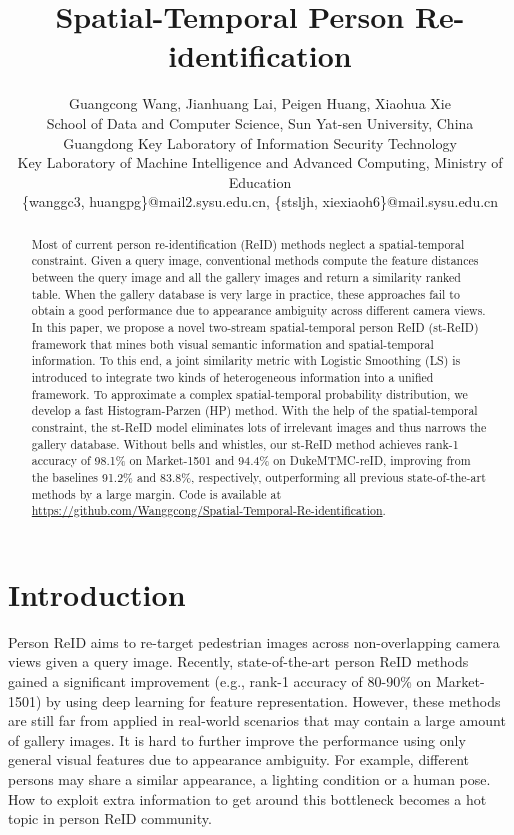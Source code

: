 \documentclass[letterpaper]{article} \usepackage{aaai19}  \usepackage{times}  \usepackage{helvet}  \usepackage{courier}  \usepackage{url}  \usepackage{graphicx}  \usepackage{subfig}
\begin{document}
\title{Spatial-Temporal Person Re-identification}
\author{Guangcong Wang, Jianhuang Lai, Peigen Huang, Xiaohua Xie\\
School of Data and Computer Science, Sun Yat-sen University, China\\
Guangdong Key Laboratory of Information Security Technology\\
Key Laboratory of Machine Intelligence and Advanced Computing, Ministry of Education\\
\{wanggc3, huangpg\}@mail2.sysu.edu.cn, \{stsljh, xiexiaoh6\}@mail.sysu.edu.cn\\
}
\maketitle
\begin{abstract}
Most of current person re-identification (ReID) methods neglect a spatial-temporal constraint. Given a query image, conventional methods compute the feature distances between the query image and all the gallery images and return a similarity ranked table. When the gallery database is very large in practice, these approaches fail to obtain a good performance due to appearance ambiguity across different camera views. In this paper, we propose a novel two-stream spatial-temporal person ReID (st-ReID) framework that mines both visual semantic information and spatial-temporal information. To this end, a joint similarity metric with Logistic Smoothing (LS) is introduced to integrate two kinds of heterogeneous information into a unified framework. To approximate a complex spatial-temporal probability distribution, we develop a fast Histogram-Parzen (HP) method. With the help of the spatial-temporal constraint, the st-ReID model eliminates lots of irrelevant images and thus narrows the gallery database. Without bells and whistles, our st-ReID method achieves rank-1 accuracy of 98.1\% on Market-1501 and 94.4\% on DukeMTMC-reID, improving from the baselines 91.2\% and 83.8\%, respectively, outperforming all previous state-of-the-art methods by a large margin. Code is available at \url{https://github.com/Wanggcong/Spatial-Temporal-Re-identification}.
\end{abstract}

\section{Introduction}
\noindent Person ReID aims to re-target pedestrian images across non-overlapping camera views given a query image. Recently, state-of-the-art person ReID methods \cite{Wang2016DARI,Zhong2017CVPR,Bai2017CVPR,Tang2017CVPR,zhuo2018occluded,lin2016cross} gained a significant improvement (e.g., rank-1 accuracy of 80-90\% on Market-1501) by using deep learning for feature representation. However, these methods are still far from applied in real-world scenarios that may contain a large amount of gallery images. It is hard to further improve the performance using only general visual features due to appearance ambiguity. For example, different persons may share a similar appearance, a lighting condition or a human pose. How to exploit extra information to get around this bottleneck becomes a hot topic in person ReID community.
\end{document}

